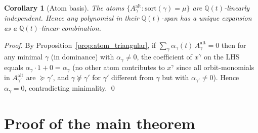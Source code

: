 \documentclass[11pt]{article}
\newtheorem{corollary}[theorem]{Corollary}
\theoremstyle{definition}
\begin{document}
\begin{corollary}[Atom basis]\label{cor:atom_basis}
The atoms $\{A^{\mathrm{alt}}_\gamma : \mathrm{sort}(\gamma) = \mu\}$ are
$\mathbb{Q}(t)$-linearly independent. Hence any polynomial in their
$\mathbb{Q}(t)$-span has a unique expansion as a $\mathbb{Q}(t)$-linear
combination.
\end{corollary}

\begin{proof}
By Proposition~\ref{prop:atom_triangular}, if
$\sum_\gamma \alpha_\gamma(t)\, A^{\mathrm{alt}}_\gamma = 0$ then for any
minimal $\gamma$ (in dominance) with $\alpha_\gamma \ne 0$, the coefficient
of $x^\gamma$ on the LHS equals $\alpha_\gamma \cdot 1 + 0 = \alpha_\gamma$
(no other atom contributes to $x^\gamma$ since all orbit-monomials in
$A^{\mathrm{alt}}_{\gamma'}$ are $\succeq \gamma'$, and $\gamma \not\succeq \gamma'$
for $\gamma'$ different from $\gamma$ but with $\alpha_{\gamma'} \ne 0$).
Hence $\alpha_\gamma = 0$, contradicting minimality. \qed
\end{proof}

\section{Proof of the main theorem}\label{sec:proof}
\end{document}
